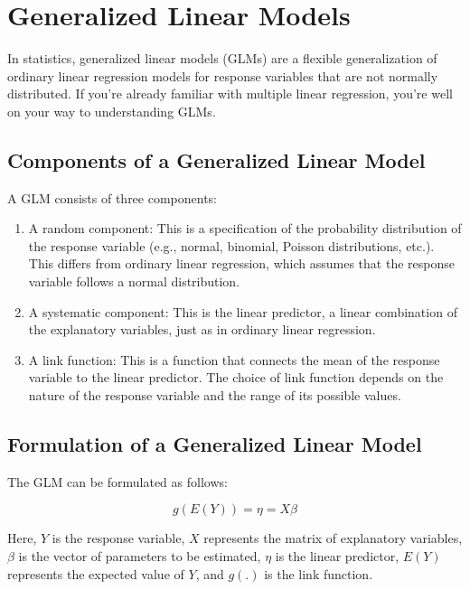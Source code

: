 \chapter{Generalized Linear Models}

In statistics, generalized linear models (GLMs) are a flexible generalization of ordinary linear regression models for response variables that are not normally distributed. If you're already familiar with multiple linear regression, you're well on your way to understanding GLMs.

\section{Components of a Generalized Linear Model}

A GLM consists of three components:

\begin{enumerate}
    \item A random component: This is a specification of the probability distribution of the response variable (e.g., normal, binomial, Poisson distributions, etc.). This differs from ordinary linear regression, which assumes that the response variable follows a normal distribution.
    \item A systematic component: This is the linear predictor, a linear combination of the explanatory variables, just as in ordinary linear regression.
    \item A link function: This is a function that connects the mean of the response variable to the linear predictor. The choice of link function depends on the nature of the response variable and the range of its possible values.
\end{enumerate}

\section{Formulation of a Generalized Linear Model}

The GLM can be formulated as follows:

\begin{equation}
g(E(Y)) = \eta = X\beta
\end{equation}

Here, $Y$ is the response variable, $X$ represents the matrix of explanatory variables, $\beta$ is the vector of parameters to be estimated, $\eta$ is the linear predictor, $E(Y)$ represents the expected value of $Y$, and $g(.)$ is the link function.

